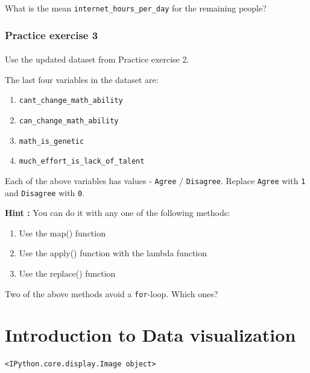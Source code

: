 \documentclass[
  letterpaper,
  DIV=11,
  numbers=noendperiod]{scrreprt}
\begin{document}
What is the mean \texttt{internet\_hours\_per\_day} for the remaining
people?

\hypertarget{practice-exercise-3-2}{%
\subsection{Practice exercise 3}\label{practice-exercise-3-2}}

\hypertarget{section-38}{%
\subsubsection{}\label{section-38}}

Use the updated dataset from Practice exercise 2.

The last four variables in the dataset are:

\begin{enumerate}
\def\labelenumi{\arabic{enumi}.}
\item
  \texttt{cant\_change\_math\_ability}
\item
  \texttt{can\_change\_math\_ability}
\item
  \texttt{math\_is\_genetic}
\item
  \texttt{much\_effort\_is\_lack\_of\_talent}
\end{enumerate}

Each of the above variables has values - \texttt{Agree} /
\texttt{Disagree}. Replace \texttt{Agree} with \texttt{1} and
\texttt{Disagree} with \texttt{0}.

\textbf{Hint :} You can do it with any one of the following methods:

\begin{enumerate}
\def\labelenumi{\arabic{enumi}.}
\item
  Use the map() function
\item
  Use the apply() function with the lambda function
\item
  Use the replace() function
\end{enumerate}

Two of the above methods avoid a \texttt{for}-loop. Which ones?

\hypertarget{introduction-to-data-visualization}{%
\chapter{Introduction to Data
visualization}\label{introduction-to-data-visualization}}

\begin{verbatim}
<IPython.core.display.Image object>
\end{verbatim}
\end{document}
